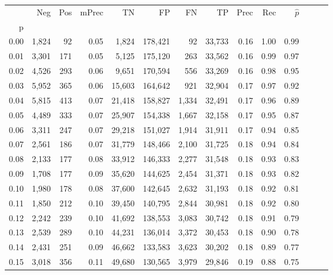 \begin{tabular}{rrrrrrrrrrrrrr}
\toprule
{} &    Neg &  Pos & mPrec &       TN &       FP &      FN &      TP &  Prec &   Rec & $\hat{p}$ \\
p    &        &      &       &          &          &         &         &       &       &           \\
\midrule
0.00 &  1,824 &   92 &  0.05 &    1,824 &  178,421 &      92 &  33,733 &  0.16 &  1.00 &      0.99 \\
0.01 &  3,301 &  171 &  0.05 &    5,125 &  175,120 &     263 &  33,562 &  0.16 &  0.99 &      0.97 \\
0.02 &  4,526 &  293 &  0.06 &    9,651 &  170,594 &     556 &  33,269 &  0.16 &  0.98 &      0.95 \\
0.03 &  5,952 &  365 &  0.06 &   15,603 &  164,642 &     921 &  32,904 &  0.17 &  0.97 &      0.92 \\
0.04 &  5,815 &  413 &  0.07 &   21,418 &  158,827 &   1,334 &  32,491 &  0.17 &  0.96 &      0.89 \\
0.05 &  4,489 &  333 &  0.07 &   25,907 &  154,338 &   1,667 &  32,158 &  0.17 &  0.95 &      0.87 \\
0.06 &  3,311 &  247 &  0.07 &   29,218 &  151,027 &   1,914 &  31,911 &  0.17 &  0.94 &      0.85 \\
0.07 &  2,561 &  186 &  0.07 &   31,779 &  148,466 &   2,100 &  31,725 &  0.18 &  0.94 &      0.84 \\
0.08 &  2,133 &  177 &  0.08 &   33,912 &  146,333 &   2,277 &  31,548 &  0.18 &  0.93 &      0.83 \\
0.09 &  1,708 &  177 &  0.09 &   35,620 &  144,625 &   2,454 &  31,371 &  0.18 &  0.93 &      0.82 \\
0.10 &  1,980 &  178 &  0.08 &   37,600 &  142,645 &   2,632 &  31,193 &  0.18 &  0.92 &      0.81 \\
0.11 &  1,850 &  212 &  0.10 &   39,450 &  140,795 &   2,844 &  30,981 &  0.18 &  0.92 &      0.80 \\
0.12 &  2,242 &  239 &  0.10 &   41,692 &  138,553 &   3,083 &  30,742 &  0.18 &  0.91 &      0.79 \\
0.13 &  2,539 &  289 &  0.10 &   44,231 &  136,014 &   3,372 &  30,453 &  0.18 &  0.90 &      0.78 \\
0.14 &  2,431 &  251 &  0.09 &   46,662 &  133,583 &   3,623 &  30,202 &  0.18 &  0.89 &      0.77 \\
0.15 &  3,018 &  356 &  0.11 &   49,680 &  130,565 &   3,979 &  29,846 &  0.19 &  0.88 &      0.75 \\

\end{tabular}
